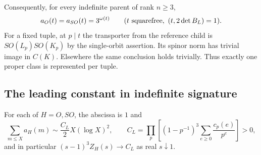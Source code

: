 Consequently, for every indefinite parent of rank $n\ge3$,
\begin{equation}\label{eq:indsquarefree}
 a_O(t)=a_{SO}(t)=3^{\omega(t)}\qquad(t\ {\rm squarefree},\ (t,2\det B_L)=1).
\end{equation}
For a fixed tuple, at $p\mid t$ the transporter from the reference child is $SO(L_p)SO(K_p)$ by the single-orbit assertion. Its spinor norm has trivial image in $C(K)$. Elsewhere the same conclusion holds trivially. Thus exactly one proper class is represented per tuple.

\subsection{The leading constant in indefinite signature}
\begin{theorem}\label{th:indmean}
For each of $H=O,SO$, the abscissa is $1$ and
\[
 \sum_{m\le X}a_H(m)\sim \frac{C_L}{2}X(\log X)^2,\qquad
 C_L=\prod_p\left[(1-p^{-1})^3\sum_{e\ge0}\frac{c_p(e)}{p^e}\right]>0,
\]
and in particular $(s-1)^3Z_H(s)\to C_L$ as real $s\downarrow1$.
\end{theorem}
